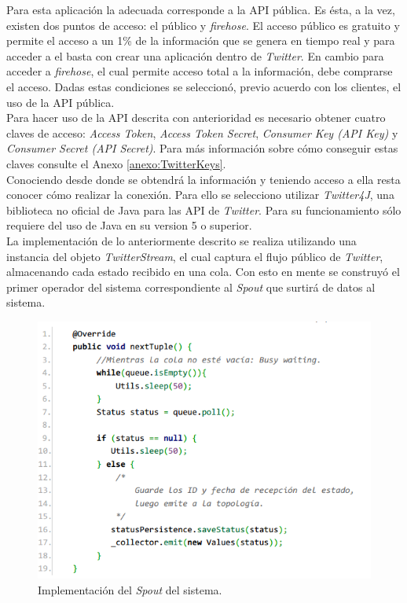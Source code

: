 Para esta aplicación la adecuada corresponde a la API pública. Es ésta, a la vez, existen dos puntos de acceso: el público y \textit{firehose}. El acceso público es gratuito y permite el acceso a un 1\% de la información que se genera en tiempo real y para acceder a el basta con crear una aplicación dentro de \textit{Twitter}. En cambio para acceder a \textit{firehose}, el cual permite acceso total a la información, debe comprarse el acceso. Dadas estas condiciones se seleccionó, previo acuerdo con los clientes, el uso de la API pública.\\

Para hacer uso de la API descrita con anterioridad es necesario obtener cuatro claves de acceso: \textit{Access Token}, \textit{Access Token Secret}, \textit{Consumer Key (API Key)} y \textit{Consumer Secret (API Secret)}. Para más información sobre cómo conseguir estas claves consulte el Anexo \ref{anexo:TwitterKeys}.\\

Conociendo desde donde se obtendrá la información y teniendo acceso a ella resta conocer cómo realizar la conexión. Para ello se selecciono utilizar \textit{Twitter4J}, una biblioteca no oficial de Java para las API de \textit{Twitter}. Para su funcionamiento sólo requiere del uso de Java en su version 5 o superior.\\

La implementación de lo anteriormente descrito se realiza utilizando una instancia del objeto \textit{TwitterStream}, el cual captura el flujo público de \textit{Twitter}, almacenando cada estado recibido en una cola. Con esto en mente se construyó el primer operador del sistema correspondiente al \textit{Spout} que surtirá de datos al sistema.\\

\begin{figure}[H]
	\centering
	\captionsetup{justification=centering}
	\includegraphics[scale=0.8]{images/TwitterSpout.png}
	\caption[Implementación del \textit{Spout} del sistema.]{Implementación del \textit{Spout} del sistema.}
	\label{fig:TwitterSpout}
\end{figure}

